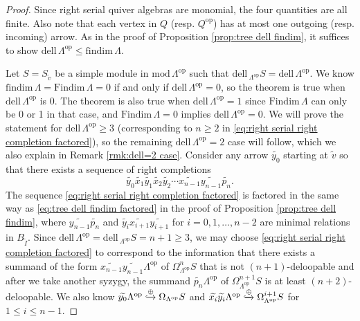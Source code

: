 \documentclass[10pt,a4paper]{amsart}
\newcommand{\Findim}{\mathrm{Findim}\,}
\newcommand{\dell}{\mathrm{dell}\,}
\newcommand{\dirsum}{\xhookrightarrow{\!\oplus}}
\newcommand{\findim}{\mathrm{findim}\,}
\newcommand{\op}{\mathrm{op}}
\renewcommand{\mod}{\mathrm{mod}\,}
\begin{document}
\begin{proof}
Since right serial quiver algebras are monomial, the four quantities are all finite. Also note that each vertex in $Q$ (resp. $Q^{\op}$) has at most one outgoing (resp. incoming) arrow. As in the proof of Proposition \ref{prop:tree dell findim}, it suffices to show $\dell\Lambda^{\op}\leq\findim\Lambda$. 

Let $S=S_{\tilde{v}}$ be a simple module in $\mod\Lambda^{\op}$ such that $\dell\!_{\Lambda^{\op}} S = \dell\Lambda^{\op}$. We know $\findim\Lambda=\Findim\Lambda=0$ if and only if $\dell\Lambda^{\op}=0$, so the theorem is true when $\dell\Lambda^{\op}$ is 0. The theorem is also true when $\dell\Lambda^{\op}=1$ since $\Findim\Lambda$ can only be 0 or 1 in that case, and $\Findim\Lambda=0$ implies $\dell\Lambda^{\op}=0$. We will prove the statement for $\dell\Lambda^{\op}\geq 3$ (corresponding to $n\geq 2$ in \eqref{eq:right serial right completion factored}), so the remaining $\dell\Lambda^{\op}=2$ case will follow, which we also explain in Remark \ref{rmk:dell=2 case}. Consider any arrow $\widetilde{y_0}$ starting at $\tilde{v}$ so that there exists a sequence of right completions
\begin{equation}
\label{eq:right serial right completion factored}
\widetilde{y_0}\widetilde{x_1}\widetilde{y_1}\widetilde{x_2}\widetilde{y_2} \cdots \widetilde{x_{n-1}}\widetilde{y_{n-1}}\widetilde{p_n}.
\end{equation}
The sequence \eqref{eq:right serial right completion factored} is factored in the same way as \eqref{eq:tree dell findim factored} in the proof of Proposition \ref{prop:tree dell findim}, where $\widetilde{y_{n-1}}\widetilde{p_n}$ and $\widetilde{y_i}\widetilde{x_{i+1}}\widetilde{y_{i+1}}$ for $i=0,1,\dots,n-2$ are minimal relations in $B_{\tilde{I}}$. Since $\dell\Lambda^{\op} = \dell_{\Lambda^{\op}} S = n+1 \geq 3$, we may choose \eqref{eq:right serial right completion factored} to correspond to the information that there exists a summand of the form $\widetilde{x_{n-1}}\widetilde{y_{n-1}}\Lambda^{\op}$ of $\Omega_{\Lambda^{\op}}^n S$ that is not $(n+1)$-deloopable and after we take another syzygy, the summand $\widetilde{p_n}\Lambda^{\op}$ of $\Omega_{\Lambda^{\op}}^{n+1} S$ is at least $(n+2)$-deloopable. We also know $\widetilde{y_0}\Lambda^{\op}\dirsum \Omega_{\Lambda^{\op}} S$ and $\widetilde{x_i}\widetilde{y_i}\Lambda^{\op}\dirsum \Omega_{\Lambda^{\op}}^{i+1} S$ for $1\leq i\leq n-1$.


\end{proof}
\end{document}
